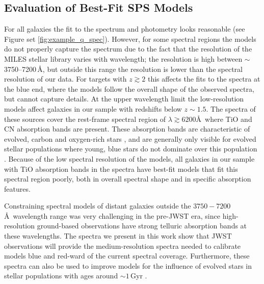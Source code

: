 \documentclass[twocolumn, astrosymb]{aastex631}
\begin{document}
\subsection{Evaluation of Best-Fit SPS Models}
For all galaxies the fit to the spectrum and photometry looks reasonable (see Figure set \ref{fig:example_q_spec}). However, for some spectral regions the models do not properly capture the spectrum due to the fact that the resolution of the MILES stellar library varies with wavelength; the resolution is high between $\sim$3750--7200\,\AA, but outside this range the resolution is lower than the spectral resolution of our data. For targets with $z \gtrsim 2$ this affects the fits to the spectra at the blue end, where the models follow the overall shape of the observed spectra, but cannot capture details. At the upper wavelength limit the low-resolution models affect galaxies in our sample with redshifts below $z \sim 1.5$. The spectra of these sources cover the rest-frame spectral region of $\lambda \gtrsim 6200$\AA\ where TiO and CN absorption bands are present. These absorption bands are characteristic of evolved, carbon and oxygen-rich stars \citep[e.g.][]{SLu2024}, and are generally only visible for evolved stellar populations where young, blue stars do not dominate over this population \citep[e.g.][]{FAllard2000, JSánchez2012}. Because of the low spectral resolution of the models, all galaxies in our sample with TiO absorption bands in the spectra have best-fit models that fit this spectral region poorly, both in overall spectral shape and in specific absorption features.

Constraining spectral models of distant galaxies outside the $3750-7200$\,\AA\ wavelength range was very challenging in the pre-JWST era, since high-resolution ground-based observations have strong telluric absorption bands at these wavelengths. The spectra we present in this work show that JWST observations will provide the medium-resolution spectra needed to calibrate models blue and red-ward of the current spectral coverage. Furthermore, these spectra can also be used to improve models for the influence of evolved stars in stellar populations with ages around $\sim1$\,Gyr \citep[e.g.,][]{CMaraston2005, MKriek2010, SZibetti2013, SLu2024}.
\end{document}
